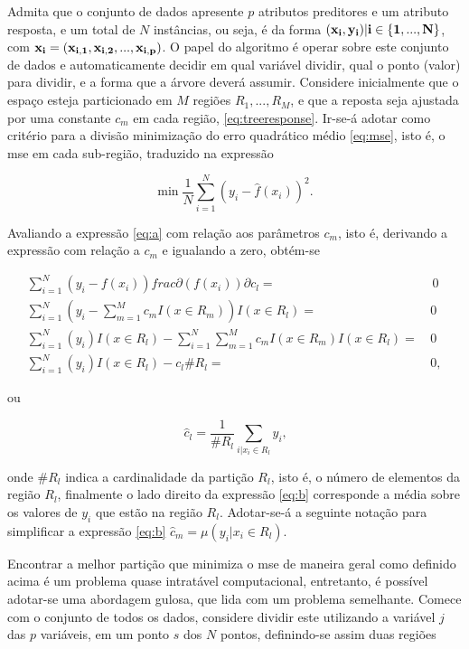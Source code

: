 Admita que o conjunto de dados apresente $p$ atributos preditores e um atributo resposta, e um total de $N$ instâncias, ou seja, é da forma $(\bf{x}_i,y_i)|i\in\{1,...,N\}$, com $\bf{x}_i=(x_{i,1}, x_{i,2}, ..., x_{i,p})$. O papel do algoritmo é operar sobre este conjunto de dados e automaticamente decidir em qual variável dividir, qual o ponto (valor) para dividir, e a forma que a árvore deverá assumir. Considere inicialmente que o espaço esteja particionado em $M$ regiões $R_1,...,R_M$, e que a reposta seja ajustada por uma constante $c_m$ em cada região, \eqref{eq:treeresponse}. Ir-se-á adotar como critério para a divisão minimização do erro quadrático médio \eqref{eq:mse}, isto é, o mse em cada sub-região, traduzido na expressão

\begin{equation}\label{eq:a}
\min\frac{1}{N}\sum_{i=1}^N(y_i-\hat{f}(x_i))^2\mbox{.}~
\end{equation}

Avaliando a expressão \eqref{eq:a} com relação aos parâmetros $c_m$, isto é, derivando a expressão com relação a $c_m$ e igualando a zero, obtém-se

\begin{align}
\sum_{i=1}^N(y_i-f(x_i))frac{\partial(f(x_i))}{\partial{c_l}}=&\,0 \nonumber \\
\sum_{i=1}^N(y_i-\sum_{m=1}^Mc_mI(x\in{R_m}))I(x\in{R_l})=\,&0 \nonumber \\
\sum_{i=1}^N(y_i)I(x\in{R_l}) - \sum_{i=1}^N\sum_{m=1}^Mc_mI(x\in{R_m})I(x\in{R_l})=\,&0 \nonumber\\
\sum_{i=1}^N(y_i)I(x\in{R_l}) - c_l \#R_l=\,&0\mbox{,}~
\end{align}

ou

\begin{equation}\label{eq:b}
\hat{c}_l=\frac{1}{\#R_l}\sum_{i|x_i \in{R_l}}y_i\mbox{,}
\end{equation}

onde $\#R_l$ indica a cardinalidade da partição $R_l$, isto é, o número de elementos da região $R_l$, finalmente o lado direito da expressão \eqref{eq:b} corresponde a média sobre os valores de $y_i$ que estão na região $R_l$. Adotar-se-á a seguinte notação para simplificar a expressão \eqref{eq:b} $\hat{c}_m=\mu(y_i|x_i\in{R_l})$. 

Encontrar a melhor partição que minimiza o mse de maneira geral como definido acima é um problema quase intratável computacional, entretanto, é possível adotar-se uma abordagem gulosa, que lida com um problema semelhante. Comece com o conjunto de todos os dados, considere dividir este utilizando a variável $j$ das $p$ variáveis, em um ponto $s$ dos $N$ pontos, definindo-se assim duas regiões

